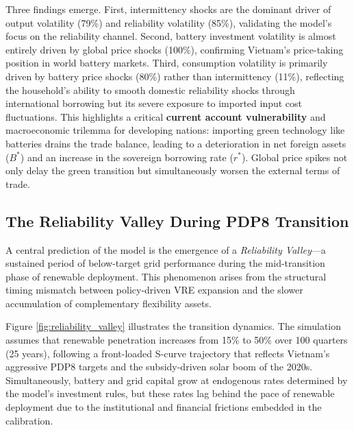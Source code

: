 \documentclass[12pt, a4paper]{article}
\begin{document}
Three findings emerge. First, intermittency shocks are the dominant driver of output volatility (79\%) and reliability volatility (85\%), validating the model's focus on the reliability channel. Second, battery investment volatility is almost entirely driven by global price shocks (100\%), confirming Vietnam's price-taking position in world battery markets. Third, consumption volatility is primarily driven by battery price shocks (80\%) rather than intermittency (11\%), reflecting the household's ability to smooth domestic reliability shocks through international borrowing but its severe exposure to imported input cost fluctuations. This highlights a critical \textbf{current account vulnerability} and macroeconomic trilemma for developing nations: importing green technology like batteries drains the trade balance, leading to a deterioration in net foreign assets ($B^*$) and an increase in the sovereign borrowing rate ($r^*$). Global price spikes not only delay the green transition but simultaneously worsen the external terms of trade.

\subsection{The Reliability Valley During PDP8 Transition} \label{subsec:valley}

A central prediction of the model is the emergence of a \textit{Reliability Valley}---a sustained period of below-target grid performance during the mid-transition phase of renewable deployment. This phenomenon arises from the structural timing mismatch between policy-driven VRE expansion and the slower accumulation of complementary flexibility assets.

Figure \ref{fig:reliability_valley} illustrates the transition dynamics. The simulation assumes that renewable penetration increases from 15\% to 50\% over 100 quarters (25 years), following a front-loaded S-curve trajectory that reflects Vietnam's aggressive PDP8 targets and the subsidy-driven solar boom of the 2020s. Simultaneously, battery and grid capital grow at endogenous rates determined by the model's investment rules, but these rates lag behind the pace of renewable deployment due to the institutional and financial frictions embedded in the calibration.
\end{document}
